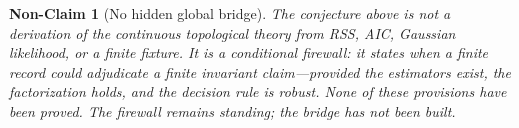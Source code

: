 \documentclass[11pt]{article}
\newtheorem{nonclaim}{Non-Claim}
\begin{document}
\begin{nonclaim}[No hidden global bridge]
The conjecture above is not a derivation of the continuous topological theory from RSS, AIC, Gaussian likelihood, or a finite fixture. It is a conditional firewall: it states when a finite record \emph{could} adjudicate a finite invariant claim---provided the estimators exist, the factorization holds, and the decision rule is robust. None of these provisions have been proved. The firewall remains standing; the bridge has not been built.
\end{nonclaim}
\end{document}
